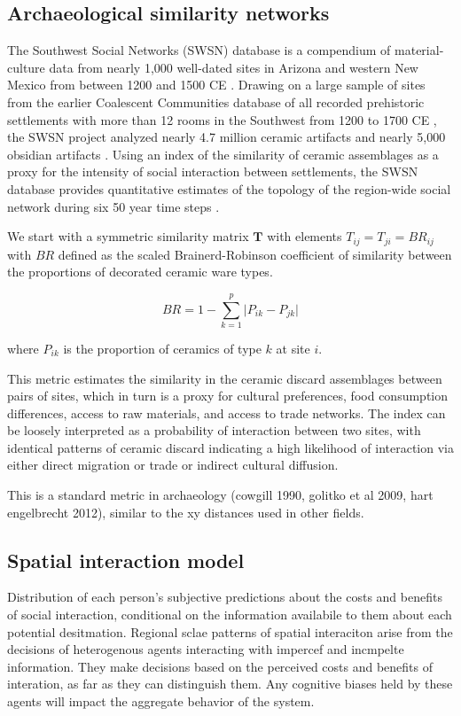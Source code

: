 \documentclass[11pt]{wlscirep}
\begin{document}
\subsection*{Archaeological similarity networks}

The Southwest Social Networks (SWSN) database is a compendium of material-culture data from nearly 1,000 well-dated sites in Arizona and western New Mexico from between 1200 and 1500 CE \cite{Mills2012,Mills2013a,Peeples2013,Borck2015,Hill2015,Mills2015a}. Drawing on a large sample of sites from the earlier Coalescent Communities database of all recorded prehistoric settlements with more than 12 rooms in the Southwest from 1200 to 1700 CE \cite{Hill2004}, the SWSN project analyzed nearly 4.7 million ceramic artifacts and nearly 5,000 obsidian artifacts \cite{Mills2015a}. Using an index of the similarity of ceramic assemblages as a proxy for the intensity of social interaction between settlements, the SWSN database provides quantitative estimates of the topology of the region-wide social network during six 50 year time steps \cite{Mills2013a}.

We start with a symmetric similarity matrix $\mathbf{T}$ with elements $T_{ij} = T_{ji} = BR_{ij}$ with $BR$ defined as the scaled Brainerd-Robinson coefficient of similarity between the proportions of decorated ceramic ware types.

$$BR = 1 - \sum_{k=1}^{p} \lvert P_{ik} - P_{jk} \rvert$$

where $P_{ik}$ is the proportion of ceramics of type $k$ at site $i$.

This metric estimates the similarity in the ceramic discard assemblages between pairs of sites, which in turn is a proxy for cultural preferences, food consumption differences, access to raw materials, and access to trade networks. The index can be loosely interpreted as a probability of interaction between two sites, with identical patterns of ceramic discard indicating a high likelihood of interaction via either direct migration or trade or indirect cultural diffusion.

This is a standard metric in archaeology (cowgill 1990, golitko et al 2009, hart engelbrecht 2012), similar to the xy distances used in other fields.

\subsection*{Spatial interaction model}
Distribution of each person's subjective predictions about the costs and benefits of social interaction, conditional on the information availabile to them about each potential desitmation. Regional sclae patterns of spatial interaciton arise from the decisions of heterogenous agents interacting with impercef and incmpelte information. They make decisions based on the perceived costs and benefits of interation, as far as they can distinguish them. Any cognitive biases held by these agents will impact the aggregate behavior of the system.
\end{document}
